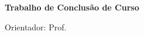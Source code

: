\documentclass[12pt,a4paper,header]{abnt}
\begin{document}
\begin{titlepage}

\thispagestyle{logouff}

\vspace{2cm}

\hspace{.2\textwidth} %
\begin{minipage}{.7\textwidth}

\begin{flushright}

{\large \bf \ABNTautordata} \\[3cm]

{\Large \bf \ABNTtitulodata}\\[3cm]

{\bf Trabalho de Conclusão de Curso}\\[1cm]

\end{flushright}

\begin{espacosimples}

\ABNTcomentariodata

\end{espacosimples}

\vspace{1cm}

\hfill Orientador: Prof. \ABNTorientadordata

\end{minipage}

\vspace{7cm}

\begin{center}

\ABNTlocaldata

\ABNTdatadata

\end{center}

\end{titlepage}


\newpage
\null
\vfill

\fbox{
}
\vspace{1cm}
\end{document}
